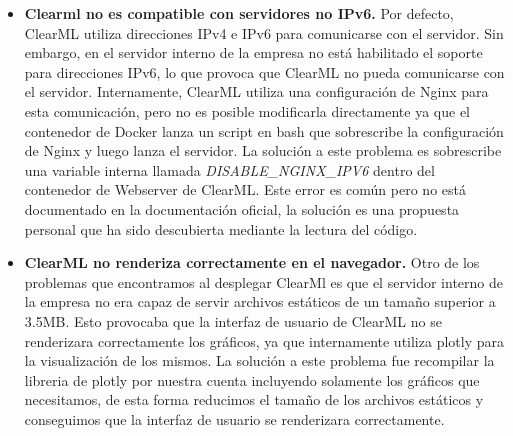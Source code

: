 \begin{itemize}
    \item \textbf{Clearml no es compatible con servidores no IPv6.} Por defecto,
    ClearML utiliza direcciones IPv4 e IPv6 para comunicarse con el servidor. Sin
    embargo, en el servidor interno de la empresa no está habilitado el soporte
    para direcciones IPv6, lo que provoca que ClearML no pueda comunicarse con el
    servidor. Internamente, ClearML utiliza una configuración de Nginx para esta
    comunicación, pero no es posible modificarla directamente ya que el contenedor de
    Docker lanza un script en bash que sobrescribe la configuración de Nginx y luego lanza
    el servidor. La solución a este problema es sobrescribe una variable interna llamada
    \textit{DISABLE\_NGINX\_IPV6} dentro del contenedor de Webserver de ClearML. Este
    error es común pero no está documentado en la documentación oficial, la solución
    es una propuesta personal que ha sido descubierta mediante la lectura del código.
    \item \textbf{ClearML no renderiza correctamente en el navegador.} Otro de los problemas
    que encontramos al desplegar ClearMl es que el servidor interno de la empresa no
    era capaz de servir archivos estáticos de un tamaño superior a 3.5MB. Esto provocaba
    que la interfaz de usuario de ClearML no se renderizara correctamente los gráficos,
    ya que internamente utiliza plotly para la visualización de los mismos. La solución
    a este problema fue recompilar la libreria de plotly por nuestra cuenta incluyendo
    solamente los gráficos que necesitamos, de esta forma reducimos el tamaño de los
    archivos estáticos y conseguimos que la interfaz de usuario se renderizara correctamente.
\end{itemize}